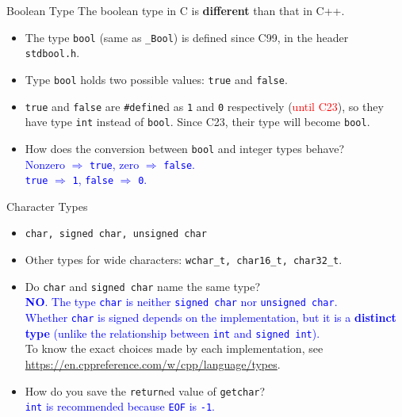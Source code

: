 \documentclass[handout]{beamer}
\newcommand{\red}[1]{\textcolor{red}{#1}}
\newcommand{\blue}[1]{\textcolor{blue}{#1}}
\begin{document}
\begin{frame}{Boolean Type}
    The boolean type in C is \textbf{different} than that in C++.
    \begin{itemize}
        \item The type \texttt{bool} (same as \texttt{\_Bool}) is defined since C99, in the header \texttt{stdbool.h}.
        \pause
        \item Type \texttt{bool} holds two possible values: \texttt{true} and \texttt{false}.
        \item \texttt{true} and \texttt{false} are \texttt{\#define}d as \texttt{1} and \texttt{0} respectively (\red{until C23}), so they have type \texttt{int} instead of \texttt{bool}. Since C23, their type will become \texttt{bool}.
        \pause
        \item How does the conversion between \texttt{bool} and integer types behave?\\
        \pause
        \blue{Nonzero \(\Rightarrow\) \texttt{true}, zero \(\Rightarrow\) \texttt{false}.}\\
        \blue{\texttt{true} \(\Rightarrow\) \texttt{1}, \texttt{false} \(\Rightarrow\) \texttt{0}.}
    \end{itemize}
\end{frame}

\begin{frame}{Character Types}
    \begin{itemize}
        \item \texttt{char, signed char, unsigned char}
        \item Other types for wide characters: \texttt{wchar\_t, char16\_t, char32\_t}.
        \pause
        \item Do \texttt{char} and \texttt{signed char} name the same type?\\
        \pause
        \blue{\textbf{NO}. The type \texttt{char} is neither \texttt{signed char} nor \texttt{unsigned char}.}\\
        \blue{Whether \texttt{char} is signed depends on the implementation, but it is a \textbf{distinct type} (unlike the relationship between \texttt{int} and \texttt{signed int}).}\\
        \pause
        To know the exact choices made by each implementation, see \url{https://en.cppreference.com/w/cpp/language/types}.
        \pause
        \item How do you save the \texttt{return}ed value of \texttt{getchar}?\\
        \pause
        \blue{\texttt{int} is recommended because \texttt{EOF} is \texttt{-1}.}
    \end{itemize}
\end{frame}
\end{document}
